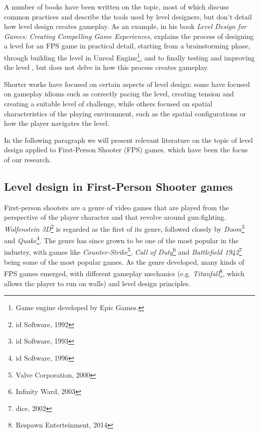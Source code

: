 \documentclass{Configuration_Files/PoliMi3i_thesis}
\begin{document}
A number of books have been written on the topic, most of which discuss common practices and describe the tools used by level designers, but don't detail how level design creates gameplay. As an example, in his book \textit{Level Design for Games: Creating Compelling Game Experiences},  explains the process of designing a level for an FPS game in practical detail, starting from a brainstorming phase, through building the level in Unreal Engine\footnote{Game engine developed by Epic Games.}, and to finally testing and improving the level \cite{co_level_2006}, but does not delve in how this process creates gameplay. \cite{hullett_design_2010}

Shorter works have focused on certain aspects of level design: some have focused on gameplay idioms such as correctly pacing the level, creating tension and creating a suitable level of challenge, while others focused on spatial characteristics of the playing environment, such as the spatial configurations or how the player navigates the level. \cite{hullett_design_2010}

In the following paragraph we will present relevant literature on the topic of level design applied to First-Person Shooter (FPS) games, which have been the focus of our research.

\subsection{Level design in First-Person Shooter games}
First-person shooters are a genre of video games that are played from the perspective of the player character and that revolve around gun-fighting. \textit{Wolfenstein 3D}\footnote{id Software, 1992} is regarded as the first of its genre, followed closely by \textit{Doom}\footnote{id Software, 1993} and \textit{Quake}\footnote{id Software, 1996}. The genre has since grown to be one of the most popular in the industry, with games like \textit{Counter-Strike}\footnote{Valve Corporation, 2000}, \textit{Call of Duty}\footnote{Infinity Ward, 2003} and \textit{Battlefield 1942}\footnote{dice, 2002} being some of the most popular games. As the genre developed, many kinds of FPS games emerged, with different gameplay mechanics (e.g. \textit{Titanfall}\footnote{Respawn Enterteinment, 2014}, which allows the player to run on walls) and level design principles. 
\end{document}
